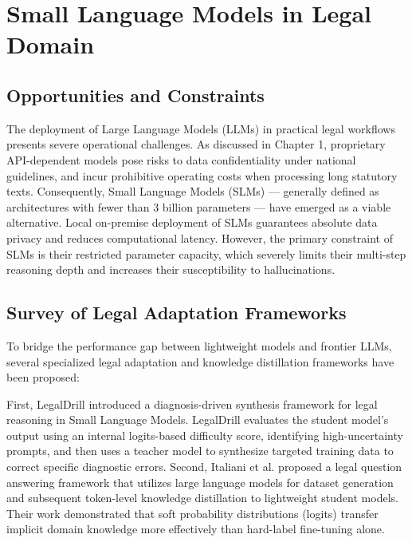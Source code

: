\section{Small Language Models in Legal Domain}

\subsection{Opportunities and Constraints}

The deployment of Large Language Models (LLMs) in practical legal workflows presents severe operational challenges. As discussed in Chapter 1, proprietary API-dependent models pose risks to data confidentiality under national guidelines, and incur prohibitive operating costs when processing long statutory texts. Consequently, Small Language Models (SLMs) --- generally defined as architectures with fewer than 3 billion parameters --- have emerged as a viable alternative. Local on-premise deployment of SLMs guarantees absolute data privacy and reduces computational latency. However, the primary constraint of SLMs is their restricted parameter capacity, which severely limits their multi-step reasoning depth and increases their susceptibility to hallucinations.

\subsection{Survey of Legal Adaptation Frameworks}

To bridge the performance gap between lightweight models and frontier LLMs, several specialized legal adaptation and knowledge distillation frameworks have been proposed:

First, LegalDrill \parencite{li2026legaldrilldiagnosisdrivensynthesislegal} introduced a diagnosis-driven synthesis framework for legal reasoning in Small Language Models. LegalDrill evaluates the student model's output using an internal logits-based difficulty score, identifying high-uncertainty prompts, and then uses a teacher model to synthesize targeted training data to correct specific diagnostic errors. Second, Italiani et al. \parencite{italiani2025enhancing} proposed a legal question answering framework that utilizes large language models for dataset generation and subsequent token-level knowledge distillation to lightweight student models. Their work demonstrated that soft probability distributions (logits) transfer implicit domain knowledge more effectively than hard-label fine-tuning alone. 

